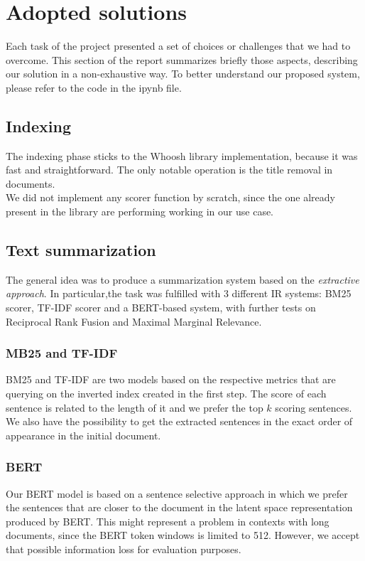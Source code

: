 \section{Adopted solutions}
Each task of the project presented a set of choices or challenges that we had to overcome. This section of the report summarizes briefly those aspects, describing our solution in a non-exhaustive way. To better understand our proposed system, please refer to the code in the ipynb file.

\subsection{Indexing}
The indexing phase sticks to the Whoosh library implementation, because it was fast and straightforward. The only notable operation is the title removal in documents.\\
We did not implement any scorer function by scratch, since the one already present in the library are performing working in our use case.  
\subsection{Text summarization}
The general idea was to produce a summarization system based on the \emph{extractive approach}. In particular,the task was fulfilled with 3 different IR systems: BM25 scorer, TF-IDF scorer and a BERT-based system, with further tests on Reciprocal Rank Fusion and Maximal Marginal Relevance. \\
\subsubsection*{MB25 and TF-IDF}
BM25 and TF-IDF are two models based on the respective metrics that are querying on the inverted index created in the first step. The score of each sentence is related to the length of it and we prefer the top $k$ scoring sentences. We also have the possibility to get the extracted sentences in the exact order of appearance in the initial document.
\subsubsection*{BERT}
Our BERT model is based on a sentence selective approach in which we prefer the sentences that are closer to the document in the latent space representation produced by BERT. This might represent a problem in contexts with long documents, since the BERT token windows is limited to 512. However, we accept that possible information loss for evaluation purposes.
